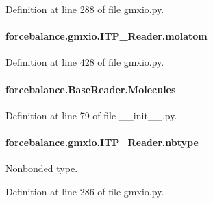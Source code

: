 Definition at line 288 of file gmxio.\-py.

\hypertarget{classforcebalance_1_1gmxio_1_1ITP__Reader_ad22477e12597eceeceedeb327d723094}{
\paragraph[{molatom}]{\setlength{\rightskip}{0pt plus 5cm}forcebalance.\-gmxio.\-I\-T\-P\-\_\-\-Reader.\-molatom}}\label{classforcebalance_1_1gmxio_1_1ITP__Reader_ad22477e12597eceeceedeb327d723094}


Definition at line 428 of file gmxio.\-py.

\hypertarget{classforcebalance_1_1BaseReader_a4369b5fb663a83b11602daa71db6862e}{
\paragraph[{Molecules}]{\setlength{\rightskip}{0pt plus 5cm}forcebalance.\-Base\-Reader.\-Molecules\hspace{0.3cm}{\ttfamily [inherited]}}}\label{classforcebalance_1_1BaseReader_a4369b5fb663a83b11602daa71db6862e}


Definition at line 79 of file \-\_\-\-\_\-init\-\_\-\-\_\-.\-py.

\hypertarget{classforcebalance_1_1gmxio_1_1ITP__Reader_ad1485d8f448b3f12c5bce4f05a18cf8c}{
\paragraph[{nbtype}]{\setlength{\rightskip}{0pt plus 5cm}forcebalance.\-gmxio.\-I\-T\-P\-\_\-\-Reader.\-nbtype}}\label{classforcebalance_1_1gmxio_1_1ITP__Reader_ad1485d8f448b3f12c5bce4f05a18cf8c}


Nonbonded type. 



Definition at line 286 of file gmxio.\-py.

